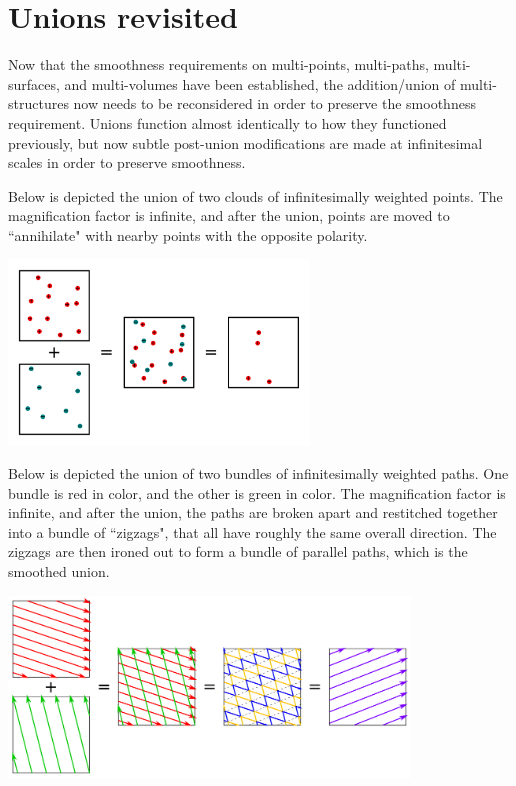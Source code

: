 \section{Unions revisited}

Now that the smoothness requirements on multi-points, multi-paths, multi-surfaces, and multi-volumes have been established, the addition/union of multi-structures now needs to be reconsidered in order to preserve the smoothness requirement. Unions function almost identically to how they functioned previously, but now subtle post-union modifications are made at infinitesimal scales in order to preserve smoothness.  

Below is depicted the union of two clouds of infinitesimally weighted points. The magnification factor is infinite, and after the union, points are moved to ``annihilate" with nearby points with the opposite polarity. 

\begin{center}
\includegraphics[width = 0.6\textwidth]{Smoothness_and_duality/point_union_smoothing}
\end{center}

Below is depicted the union of two bundles of infinitesimally weighted paths. One bundle is red in color, and the other is green in color. The magnification factor is infinite, and after the union, the paths are broken apart and restitched together into a bundle of ``zigzags", that all have roughly the same overall direction. The zigzags are then ironed out to form a bundle of parallel paths, which is the smoothed union.

\begin{center}
\includegraphics[width = 0.8\textwidth]{Smoothness_and_duality/path_union_smoothing}
\end{center}

